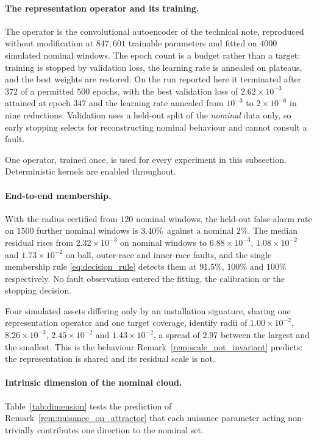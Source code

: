 \documentclass[a4paper]{cas-sc}
\begin{document}
\paragraph{The representation operator and its training.}
The operator is the convolutional autoencoder of the technical note,
reproduced without modification at \(847{,}601\) trainable parameters and
fitted on \(4000\) simulated nominal windows. The epoch count is a budget
rather than a target: training is stopped by validation loss, the learning
rate is annealed on plateaus, and the best weights are restored. On the run
reported here it terminated after \(372\) of a permitted \(500\) epochs, with
the best validation loss of \(2.62\times10^{-3}\) attained at epoch \(347\)
and the learning rate annealed from \(10^{-3}\) to \(2\times10^{-6}\) in nine
reductions. Validation uses a held-out split of the \emph{nominal} data only,
so early stopping selects for reconstructing nominal behaviour and cannot
consult a fault.

One operator, trained once, is used for every experiment in this subsection.
Deterministic kernels are enabled throughout.

\paragraph{End-to-end membership.}
With the radius certified from \(120\) nominal windows, the held-out
false-alarm rate on \(1500\) further nominal windows is \(3.40\%\)
against a nominal \(2\%\). The median residual rises from \(2.32\times10^{-3}\) on
nominal windows to \(6.88\times10^{-3}\), \(1.08\times10^{-2}\) and
\(1.73\times10^{-2}\) on ball, outer-race and inner-race faults, and the
single membership rule \eqref{eq:decision_rule} detects them at \(91.5\%\),
\(100\%\) and \(100\%\) respectively. No fault observation entered the
fitting, the calibration or the stopping decision.

Four simulated assets differing only by an installation signature, sharing one
representation operator and one target coverage, identify radii of
\(1.00\times10^{-2}\), \(8.26\times10^{-3}\), \(2.45\times10^{-2}\) and
\(1.43\times10^{-2}\), a spread of \(2.97\) between the largest and the
smallest. This is the behaviour Remark~\ref{rem:scale_not_invariant}
predicts: the representation is shared and its residual scale is not.

\paragraph{Intrinsic dimension of the nominal cloud.}
Table~\ref{tab:dimension} tests the prediction of
Remark~\ref{rem:nuisance_on_attractor} that each nuisance parameter acting
non-trivially contributes one direction to the nominal set.
\end{document}
